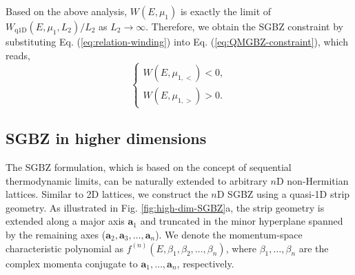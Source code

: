 \documentclass[pdflatex,sn-nature, iicol]{sn-jnl}%
\theoremstyle{thmstyleone}%
\theoremstyle{thmstyletwo}%
\theoremstyle{thmstylethree}%
\begin{document}
Based on the above analysis, $W(E,\mu_{1})$
is exactly the limit of $W_{\text{q1D}}(E,\mu_{1},L_{2})/L_{2}$ as
$L_{2}\rightarrow\infty$. Therefore, we obtain the SGBZ constraint
by substituting Eq. (\ref{eq:relation-winding}) into Eq. (\ref{eq:QMGBZ-constraint}),
which reads, 
\begin{equation}
\begin{cases}
W\left(E,\mu_{1,<}\right)<0,\\
W\left(E,\mu_{1,>}\right)>0.
\end{cases}\label{eq:SGBZ-constraint}
\end{equation}


\subsection{SGBZ in higher dimensions}

The SGBZ formulation, which is based on the concept of sequential
thermodynamic limits, can be naturally extended to arbitrary $n$D
non-Hermitian lattices. Similar to 2D lattices, we construct the $n$D
SGBZ using a quasi-1D strip geometry. As illustrated in Fig. \ref{fig:high-dim-SGBZ}a,
the strip geometry is extended along a major axis $\mathbf{a}_{1}$
and truncated in the minor hyperplane spanned by the remaining axes
($\mathbf{a}_{2},\mathbf{a}_{3},\dots,\mathbf{a}_{n}$). We denote
the momentum-space characteristic polynomial as $f^{(n)}(E,\beta_{1},\beta_{2},\dots,\beta_{n})$,
where $\beta_{1},\dots,\beta_{n}$ are the complex momenta conjugate
to $\mathbf{a}_{1},\dots,\mathbf{a}_{n}$, respectively.
\end{document}
